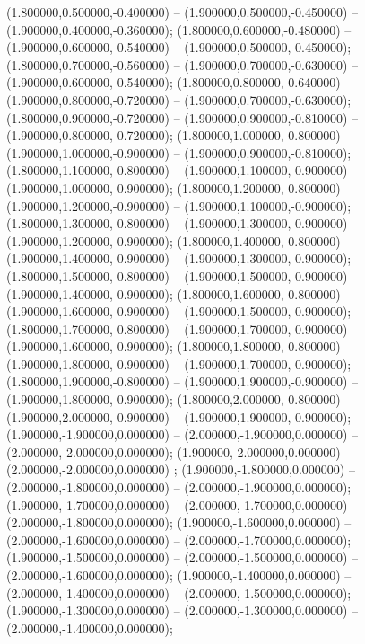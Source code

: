  (1.800000,0.500000,-0.400000) -- (1.900000,0.500000,-0.450000) -- (1.900000,0.400000,-0.360000);
 (1.800000,0.600000,-0.480000) -- (1.900000,0.600000,-0.540000) -- (1.900000,0.500000,-0.450000);
 (1.800000,0.700000,-0.560000) -- (1.900000,0.700000,-0.630000) -- (1.900000,0.600000,-0.540000);
 (1.800000,0.800000,-0.640000) -- (1.900000,0.800000,-0.720000) -- (1.900000,0.700000,-0.630000);
 (1.800000,0.900000,-0.720000) -- (1.900000,0.900000,-0.810000) -- (1.900000,0.800000,-0.720000);
 (1.800000,1.000000,-0.800000) -- (1.900000,1.000000,-0.900000) -- (1.900000,0.900000,-0.810000);
 (1.800000,1.100000,-0.800000) -- (1.900000,1.100000,-0.900000) -- (1.900000,1.000000,-0.900000);
 (1.800000,1.200000,-0.800000) -- (1.900000,1.200000,-0.900000) -- (1.900000,1.100000,-0.900000);
 (1.800000,1.300000,-0.800000) -- (1.900000,1.300000,-0.900000) -- (1.900000,1.200000,-0.900000);
 (1.800000,1.400000,-0.800000) -- (1.900000,1.400000,-0.900000) -- (1.900000,1.300000,-0.900000);
 (1.800000,1.500000,-0.800000) -- (1.900000,1.500000,-0.900000) -- (1.900000,1.400000,-0.900000);
 (1.800000,1.600000,-0.800000) -- (1.900000,1.600000,-0.900000) -- (1.900000,1.500000,-0.900000);
 (1.800000,1.700000,-0.800000) -- (1.900000,1.700000,-0.900000) -- (1.900000,1.600000,-0.900000);
 (1.800000,1.800000,-0.800000) -- (1.900000,1.800000,-0.900000) -- (1.900000,1.700000,-0.900000);
 (1.800000,1.900000,-0.800000) -- (1.900000,1.900000,-0.900000) -- (1.900000,1.800000,-0.900000);
 (1.800000,2.000000,-0.800000) -- (1.900000,2.000000,-0.900000) -- (1.900000,1.900000,-0.900000);
 (1.900000,-1.900000,0.000000) -- (2.000000,-1.900000,0.000000) -- (2.000000,-2.000000,0.000000);
 (1.900000,-2.000000,0.000000) -- (2.000000,-2.000000,0.000000) ;
 (1.900000,-1.800000,0.000000) -- (2.000000,-1.800000,0.000000) -- (2.000000,-1.900000,0.000000);
 (1.900000,-1.700000,0.000000) -- (2.000000,-1.700000,0.000000) -- (2.000000,-1.800000,0.000000);
 (1.900000,-1.600000,0.000000) -- (2.000000,-1.600000,0.000000) -- (2.000000,-1.700000,0.000000);
 (1.900000,-1.500000,0.000000) -- (2.000000,-1.500000,0.000000) -- (2.000000,-1.600000,0.000000);
 (1.900000,-1.400000,0.000000) -- (2.000000,-1.400000,0.000000) -- (2.000000,-1.500000,0.000000);
 (1.900000,-1.300000,0.000000) -- (2.000000,-1.300000,0.000000) -- (2.000000,-1.400000,0.000000);

